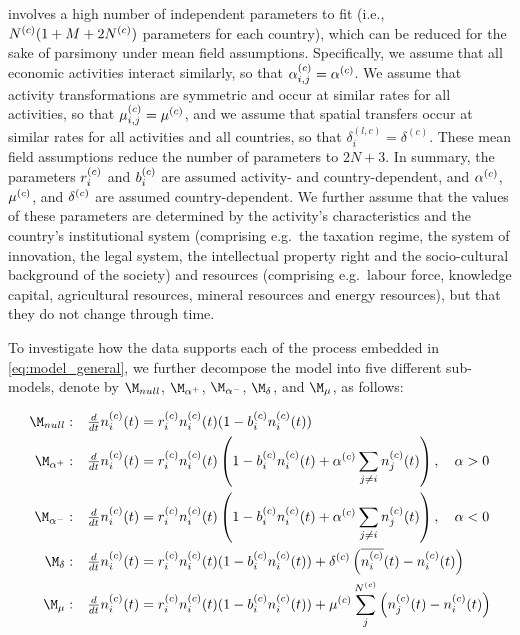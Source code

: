  involves a high number of independent parameters to fit (i.e., $N^{(c)}(1 + M + 2N^{(c)})$ parameters for each country), which can be reduced for the sake of parsimony under mean field assumptions. Specifically, we assume that all economic activities interact similarly, so that $\alpha_{i,j}^{(c)}  = \alpha^{(c)} $. We assume that activity transformations are symmetric and occur at similar rates for all activities, so that $\mu_{i,j}^{(c)}  = \mu^{(c)} $, and we assume that spatial transfers occur at similar rates for all activities and all countries, so that $\delta^{(l,c)} _{i} = \delta^{(c)}$. These mean field assumptions reduce the number of parameters to $2N+3$. 
% 
In summary, the parameters $r_i^{(c)}$ and $b_i^{(c)}$ are assumed activity- and country-dependent, and $\alpha^{(c)}$, $\mu^{(c)}$, and $\delta^{(c)}$ are assumed country-dependent. We further assume that the values of these parameters are determined by the activity's characteristics and the country's institutional system (comprising e.g.~the taxation regime, the system of innovation, the legal system, the intellectual property right and the socio-cultural background of the society) and resources (comprising e.g.~labour force, knowledge capital, agricultural resources, mineral resources and energy resources), but that they do not change through time.

To investigate how the data supports each of the process embedded in \cref{eq:model_general}, we further decompose the model into five different sub-models, denote by $\M_{null}$, $\modalphap$, $\modalphan$, $\moddelta$, and $\modmu$, as follows:

  \begin{align}
  \label{eq:submodels1}
    \M_{null}&:  &&\tfrac{d}{dt} n_i\hc(t)  = r_i\hc  n_i\hc(t) (1 -  b_i\hc n_i\hc (t) ) \\
  \label{eq:submodels2}
    \modalphap&: && \tfrac{d}{dt} n_i\hc(t)  = r_i\hc  n_i\hc(t) \left(1 -  b_i\hc n_i\hc(t) + \alpha\hc  \sum_{j \neq i} n_j\hc(t) \right), \quad \alpha > 0\\
      \label{eq:submodels3}
    \modalphan&: && \tfrac{d}{dt} n_i\hc(t)  = r_i\hc  n_i\hc(t) \left(1 -  b_i\hc  n_i\hc(t) + \alpha\hc  \sum_{j \neq i} n_j\hc(t) \right), \quad \alpha < 0\\
      \label{eq:submodels4}
    \moddelta&: && \tfrac{d}{dt} n_i\hc(t)  = r_i\hc  n_i\hc(t) (1 - b_i\hc  n_i\hc(t) ) + \delta\hc \left(\overline{n_i\hc}(t) - n_i\hc(t) \right) \\
      \label{eq:submodels5}
    \M_{\mu}&: && \tfrac{d}{dt} n_i\hc(t)  = r_i\hc  n_i\hc(t) (1 -  b_i\hc n_i\hc(t) ) + \mu\hc \sum_j^{N\hc} \left( n_j\hc  (t) - n_i\hc(t)  \right)
  \end{align}

